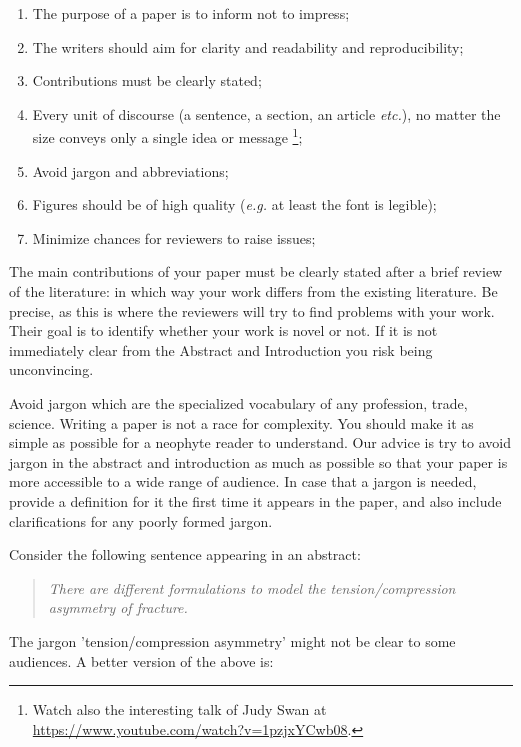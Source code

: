 \documentclass[authoryear,12pta4paper,fleqn]{article}
\makeatletter
\newcommand{\eg}{\textit{e.g.}\xspace}
\newcommand{\etc}{\textit{etc.}\@\xspace}
\numberwithin{equation}{section}
\theoremstyle{remark}
\makeatother
\begin{document}
\begin{enumerate}
\item The purpose of a paper is to inform not to impress;
\item The writers should aim for clarity and readability and  reproducibility;
\item Contributions must be clearly stated;
\item Every unit of discourse (a sentence, a section, an article \etc), no matter the size conveys only a single idea or message \citep{gopen1990science,McCarthy}\footnote{Watch also the interesting talk of Judy Swan at \url{https://www.youtube.com/watch?v=1pzjxYCwb08}.};
\item Avoid jargon and abbreviations;%
\item Figures should be of high quality (\eg at least the font is legible);
\item Minimize chances for reviewers to raise issues;
\end{enumerate}

The main contributions of your paper must be clearly stated after a brief review of the literature: in which way your work differs from the existing literature. Be precise, as this is where the reviewers will try to find problems with your work. Their goal is to identify whether your work is novel or not. If it is not immediately clear from the Abstract and Introduction you risk being unconvincing. 



Avoid jargon which are the specialized vocabulary of any profession, trade, science.  Writing a paper is not a race for complexity. You should make it as simple as possible for a neophyte reader to understand.
Our advice is try to avoid jargon in the abstract and introduction as much as possible so that your paper is more accessible to a wide range of audience. In case that a jargon is needed, provide a definition for it the first time it appears in the paper, and also include clarifications for any poorly formed jargon.

Consider the following sentence appearing in an abstract:

 \begin{quote}
  \textit{There are different formulations  to model the tension/compression asymmetry of fracture.}
 \end{quote}
The jargon 'tension/compression asymmetry' might not be clear to some audiences. A better version of the above is:
\end{document}
